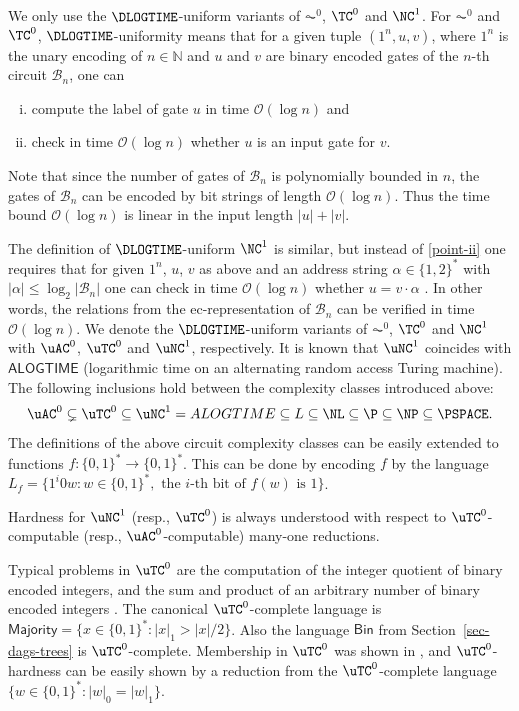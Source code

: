 \documentclass[a4paper,UKenglish,cleveref, autoref, thm-restate, numberwithinsect]{lipics-v2021}
\newcommand{\Bin}{\mathsf{Bin}}
\newcommand{\LS}{\mathsf{L}}
\begin{document}
We only use the $\DLOGTIME$-uniform variants of $\AC^0$, $\TC^0$ and $\NC^1$.
For  $\AC^0$ and $\TC^0$, $\DLOGTIME$-uniformity means that
for a given tuple $(1^n, u, v)$, where $1^n$ is the unary encoding of $n \in \mathbb{N}$ and
 $u$ and $v$ are binary encoded gates of the $n$-th circuit $\mathcal{B}_n$, one can 
\begin{enumerate}[(i)]
\item compute the label of gate $u$ in time
$\mathcal{O}(\log n)$ and
\item \label{point-ii} check in  time $\mathcal{O}(\log n)$ whether $u$ is an input gate for $v$.
\end{enumerate}
Note that since the number of gates of $\mathcal{B}_n$ is polynomially bounded in $n$, the gates of $\mathcal{B}_n$ can be encoded by bit strings of length $\mathcal{O}(\log n)$. 
Thus the time bound $\mathcal{O}(\log n)$ is linear in the input length $|u|+|v|$.

The definition of $\DLOGTIME$-uniform $\NC^1$ is similar, but instead of \eqref{point-ii}
one requires that for given $1^n$, $u$, $v$ as above and an address string $\alpha \in \{1,2\}^*$ with
$|\alpha| \leq \log_2 |\mathcal{B}_n|$ one can check in time $\mathcal{O}(\log n)$ whether $u = v \cdot \alpha$
 \cite{BIS90,Ruz81,Vollmer99}. In other words, the relations from the ec-representation of $\mathcal{B}_n$ 
 can be verified in time $\mathcal{O}(\log n)$. We denote the $\DLOGTIME$-uniform variants of $\AC^0$, $\TC^0$ and $\NC^1$ with 
$\uAC^0$, $\uTC^0$ and $\uNC^1$, respectively.
  It is known that $\uNC^1$ coincides with $\mathsf{ALOGTIME}$
 (logarithmic time on an alternating random access Turing machine). The following inclusions hold between the complexity classes introduced above:
\[
\uAC^0 \subsetneq \uTC^0 \subseteq \uNC^1 = \mathsf{ALOGTIME} \subseteq \LS \subseteq \NL \subseteq \P \subseteq \NP \subseteq \PSPACE .
\]
The definitions of the above circuit complexity classes 
can be easily extended to functions $f\colon \{0,1\}^* \to \{0,1\}^*$.
This can be done by encoding $f$ by the language $L_f = \{ 1^i 0 w : w \in \{0,1\}^*, \text{ the $i$-th bit of $f(w)$ is 1} \}$.

Hardness for $\uNC^1$ (resp., $\uTC^0$) is always understood with respect to $\uTC^0$-computable (resp., $\uAC^0$-computable)
many-one reductions.

Typical problems in $\uTC^0$ are the computation of the integer quotient of binary encoded integers, and the sum and product of an arbitrary number of binary encoded integers \cite{HeAlBa02}. The canonical $\uTC^0$-complete language is
$\mathsf{Majority} = \{ x \in \{0,1\}^* : |x|_1 > |x|/2 \}$. Also the language $\Bin$ from Section~\ref{sec-dags-trees} is 
$\uTC^0$-complete. Membership in $\uTC^0$ was shown in \cite{Loh01rta}, and $\uTC^0$-hardness can be easily shown by a reduction
from the $\uTC^0$-complete language $\{ w\in \{0,1\}^* : |w|_0 = |w|_1 \}$.
\end{document}
